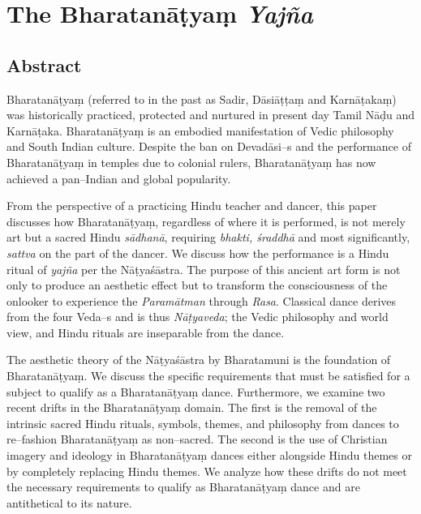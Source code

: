 
\chapter{The Bharatanāṭyaṃ \textit{Yajña}}\label{chap11}



\section*{Abstract}

Bharatanāṭyaṃ (referred to in the past as Sadir, Dāsiāṭṭaṃ and Karnāṭakaṃ) was historically practiced, protected and nurtured in present day Tamil Nāḍu and Karnāṭaka. Bharatanāṭyaṃ is an embodied manifestation of Vedic philosophy and South Indian culture. Despite the ban on Devadāsi–s and the performance of Bharatanāṭyaṃ in temples due to colonial rulers, Bharatanāṭyaṃ has now achieved a pan–Indian and global popularity.

From the perspective of a practicing Hindu teacher and dancer, this paper discusses how Bharatanāṭyaṃ, regardless of where it is performed, is not merely art but a sacred Hindu \textit{sādhanā}, requiring \textit{bhakti, śraddhā} and most significantly, \textit{sattva} on the part of the dancer. We discuss how the performance is a Hindu ritual of \textit{yajña} per the Nāṭyaśāstra. The purpose of this ancient art form is not only to produce an aesthetic effect but to transform the consciousness of the onlooker to experience the \textit{Paramātman} through \textit{Rasa}. Classical dance derives from the four Veda–s and is thus \textit{Nāṭyaveda}; the Vedic philosophy and world view, and Hindu rituals are inseparable from the dance.

The aesthetic theory of the Nāṭyaśāstra by Bharatamuni is the foundation of Bharatanāṭyaṃ. We discuss the specific requirements that must be satisfied for a subject to qualify as a Bharatanāṭyaṃ dance. Furthermore, we examine two recent drifts in the Bharatanāṭyaṃ domain. The first is the removal of the intrinsic sacred Hindu rituals, symbols, themes, and philosophy from dances to re–fashion Bharata\-nāṭyaṃ as non–sacred. The second is the use of Christian imagery and ideology in Bharatanāṭyaṃ dances either alongside Hindu themes or by completely replacing Hindu themes. We analyze how these drifts do not meet the necessary requirements to qualify as Bharatanāṭyaṃ dance and are antithetical to its nature.


